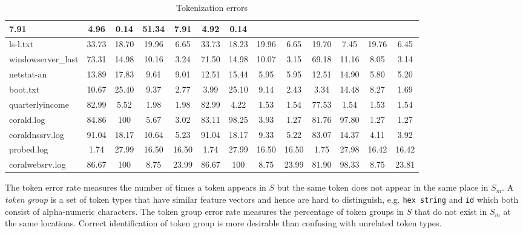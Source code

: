 \begin{table}[t]
\begin{center}
\begin{tabular}{|l||c|c|c|c||c|c|c|c||c|c|c|c|}
7.91
                     & 4.96  & 0.14  & 51.34 & 7.91     & 4.92  & 0.14  \\ \hline
ls-l.txt                   & 33.73 & 18.70 & 19.96 & 6.65  & 33.73 &
               18.23 & 19.96 & 6.65  & 19.70 & 7.45  & 19.76 & 6.45  \\ \hline
windowserver\_last     & 73.31 & 14.98 & 10.16 & 3.24  & 71.50 &
               14.98 & 10.07 & 3.15  & 69.18 & 11.16 & 8.05  & 3.14  \\ \hline
netstat-an                 & 13.89 & 17.83 & 9.61  & 9.01  & 12.51 &
               15.44 & 5.95  & 5.95  & 12.51 & 14.90 & 5.80  & 5.20  \\ \hline
boot.txt                   & 10.67 & 25.40 & 9.37  & 2.77  & 3.99 &
               25.10 & 9.14  & 2.43  & 3.34  & 14.48 & 8.27  & 1.69  \\ \hline
quarterlyincome    & 82.99 & 5.52  & 1.98  & 1.98     & 82.99 &
               4.22  & 1.53  & 1.54     & 77.53 & 1.54  & 1.53  & 1.54     \\ \hline
corald.log            & 84.86 & 100   & 5.67  & 3.02     & 83.11 &
               98.25 & 3.93  & 1.27     & 81.76 & 97.80 & 1.27  & 1.27     \\ \hline
coraldnssrv.log       & 91.04 & 18.17 & 10.64 & 5.23  & 91.04 &
               18.17 & 9.33  & 5.22  & 83.07 & 14.37 & 4.11  & 3.92  \\ \hline
probed.log            & 1.74  & 27.99 & 16.50 & 16.50 & 1.74  &
               27.99 & 16.50 & 16.50 & 1.75  & 27.98 & 16.42 & 16.42 \\ \hline
coralwebsrv.log       & 86.67 & 100   & 8.75  & 23.99 & 86.67 &
               100   & 8.75  & 23.99     & 81.90 & 98.33 & 8.75  & 23.81     \\
               \hline
\end{tabular}
\sk
\caption{Tokenization errors} \shrink 
\label{tab:error}
\end{center}
\end{table}
The token error rate measures the number of times a token appears in
$S$ but the same token does not appear in the same place in $S_m$.
A {\em token group} is a set of token types that have similar
feature vectors and hence are hard to distinguish, e.g.
{\tt hex string} and {\tt id} which both consist of alpha-numeric
characters. The token group error rate measures the percentage of 
token groups in $S$ that do not exist in $S_m$ at the same locations.
Correct identification of token group is more desirable than confusing
with unrelated token types.
